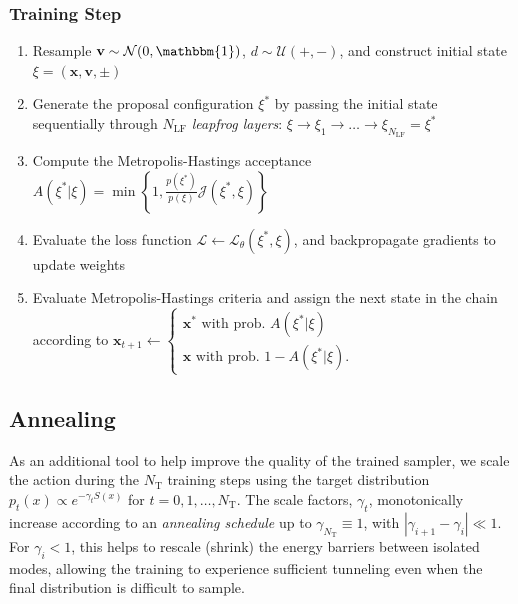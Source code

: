 \documentclass[a4paper,11pt]{article}
\newcommand{\x}{\mathbf{x}}
\newcommand{\p}{\mathbf{v}}
\begin{document}
\subsubsection{\label{subsubsec:trainstep}Training Step}
%
\begin{enumerate}
    \item Resample \(\p \sim \mathcal{N} (0, \mathbbm{1})\),
        \(d \sim \mathcal{U} (+, -)\), and construct initial state
        \(\xi = (\x, \p, \pm)\)
    \item Generate the proposal configuration \(\xi^{\ast}\) by passing the
        initial state sequentially through \(N_{\mathrm{LF}}\) \emph{leapfrog
        layers}: \(\xi \rightarrow \xi_{1}
        \rightarrow \ldots \rightarrow \xi_{N_{\mathrm{LF}}} = \xi^{\ast}\)
    \item Compute the Metropolis-Hastings acceptance \(A(\xi^{\ast} | \xi) =
      \min\left\{1, \frac{p(\xi^{\ast})}{p(\xi)}
      \mathcal{J}(\xi^{\ast},\xi) \right\}\)
    \item Evaluate the loss function \(\mathcal{L} \leftarrow
        \mathcal{L}_{\theta}(\xi^{\ast}, \xi)\), and backpropagate gradients to
        update weights
    \item Evaluate Metropolis-Hastings criteria and assign the next state in
        the chain according to
        \(\x_{t+1} \leftarrow \begin{cases}%
            \x^{\ast} \text{ with prob. } A(\xi^{\ast}|\xi) \\
            \x \text{ with prob. } 1 - A(\xi^{\ast}|\xi).
        \end{cases}\)
\end{enumerate}
%
\subsection{\label{subsec:annealing}Annealing}
As an additional tool to help improve the quality of the trained sampler, we
scale the action during the $N_{\mathrm{T}}$ training steps using the target
distribution \(p_{t}(x) \propto e^{-\gamma_{t} S(x)}\) for \(t = 0, 1, \ldots,
N_{\mathrm{T}}\).
%
The scale factors, $\gamma_{t}$, monotonically increase according to an
\emph{annealing schedule} up to $\gamma_{N_{\mathrm{T}}} \equiv 1$, with
\(|\gamma_{i+1} - \gamma_{i}| \ll 1\).
%
For \(\gamma_i < 1\), this helps to rescale (shrink) the energy barriers
between isolated modes, allowing the training to experience sufficient
tunneling even when the final distribution is difficult to sample.
%
\clearpage
\end{document}
